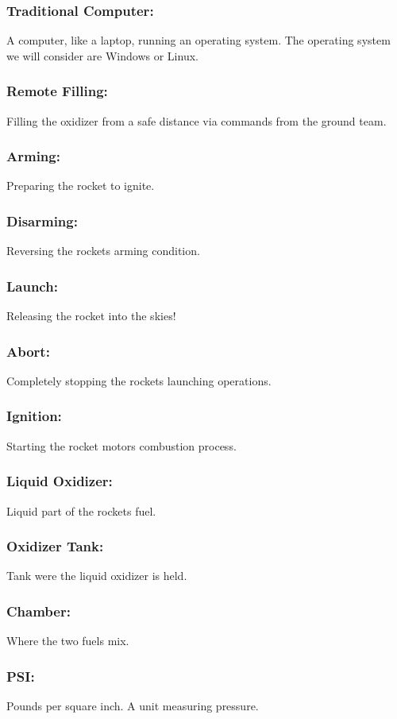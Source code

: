 \documentclass[10pt,draftclsnofoot,onecolumn,compsoc]{IEEEtran}
\begin{document}
\subsubsection{\bf Traditional Computer:}A computer, like a laptop, running an operating system. The operating system we will consider are Windows or Linux.
\subsubsection{\bf Remote Filling:} Filling the oxidizer from a safe distance via commands from the ground team.
\subsubsection{\bf Arming:} Preparing the rocket to ignite.
\subsubsection{\bf Disarming:} Reversing the rockets arming condition. 
\subsubsection{\bf Launch:} Releasing the rocket into the skies! 
\subsubsection{\bf Abort:} Completely stopping the rockets launching operations.
\subsubsection{\bf Ignition:} Starting the rocket motors combustion process.
\subsubsection{\bf Liquid Oxidizer:}Liquid part of the rockets fuel. 
\subsubsection{\bf Oxidizer Tank:} Tank were the liquid oxidizer is held. 
\subsubsection{\bf Chamber:} Where the two fuels mix.
\subsubsection{\bf PSI:}Pounds per square inch. A unit measuring pressure. 
\end{document}
